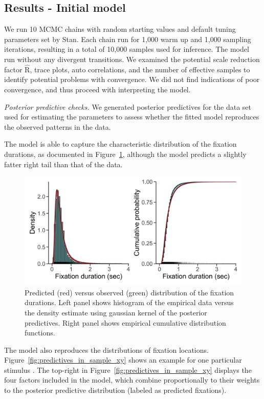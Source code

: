 \documentclass{article}
\begin{document}
\subsection{Results - Initial model}

We run 10 MCMC chains with random starting values and default tuning parameters set by Stan. Each chain run for 1,000 warm up and 1,000 sampling iterations, resulting in a total of 10,000 samples used for inference.
The model run without any divergent transitions. We examined the potential scale reduction factor $\hat{\text{R}}$, trace plots, auto correlations, and the number of effective samples to identify potential problems with convergence. We did not find indications of poor convergence, and thus proceed with interpreting the model.


\textit{Posterior predictive checks.} We generated posterior predictives for the data set used for estimating the parameters to assess whether the fitted model reproduces the observed patterns in the data.

The model is able to capture the characteristic distribution of the fixation durations, as documented in Figure~\ref{fig:predictives_in_sample_durations}, although the model predicts a slightly fatter right tail than that of the data.

\begin{figure}
    \centering
    \includegraphics[width=\textwidth]{figures/fit_model/in_sample/fixation_durations.jpg}
    \caption{Predicted (red) versus observed (green) distribution of the fixation durations. Left panel shows histogram of the empirical data versus the density estimate using gaussian kernel of the posterior predictives. Right panel shows empirical cumulative distribution functions.}
    \label{fig:predictives_in_sample_durations}
\end{figure}

The model also reproduces the distributions of fixation locations.  Figure~\ref{fig:predictives_in_sample_xy} shows an example for one particular stimulus \citep[image number $251$ from][]{xu2014beyond}. The top-right in Figure~\ref{fig:predictives_in_sample_xy} displays the four factors included in the model, which combine proportionally to their weights to the posterior predictive distribution (labeled as predicted fixations).
\end{document}
